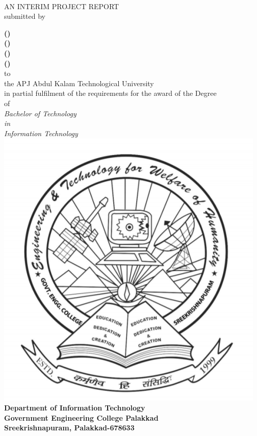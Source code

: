 \begin{titlepage}
  \begin{center}
    \textbf{\Large\cTitle}\\
    \vfill
    AN INTERIM PROJECT REPORT\\
    \vfill
    submitted by\\
    \vfill
    
    \textbf{\MakeUppercase{\cMembOne (\cMembOneRegNo)} } \\
    \textbf{\MakeUppercase{\cMembTwo (\cMembTwoRegNo)} } \\
    \textbf{\MakeUppercase{\cMembThree (\cMembThreeRegNo)} } \\
    \textbf{\MakeUppercase{\cMembFour (\cMembFourRegNo)}  } \\
    
    \vfill
    to\\
    the APJ Abdul Kalam Technological University\\
    \vfill
    in partial fulfilment of the requirements for the award of the Degree\\
    of\\
    \emph{
        Bachelor of Technology\\
        in\\
        Information Technology
    }
    \vfill
    \includegraphics[scale=.3]{"covers/images/logo_gecp.png"}
    \vfill
    \textbf{Department of Information Technology\\
      Government Engineering College Palakkad\\
      Sreekrishnapuram, Palakkad-678633}\\
    \cMonthAndYear
  \end{center}
\end{titlepage}